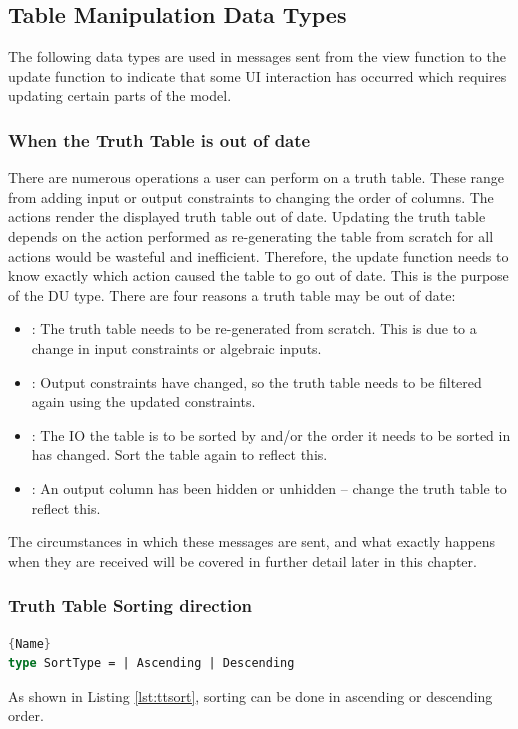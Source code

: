 \subsection{Table Manipulation Data Types}
The following data types are used in messages sent from the view function to the update function to indicate that some UI interaction has occurred which requires updating certain parts of the model.

\subsubsection{When the Truth Table is out of date}
There are numerous operations a user can perform on a truth table. These range from adding input or output constraints to changing the order of columns. The actions render the displayed truth table out of date. Updating the truth table depends on the action performed as re-generating the table from scratch for all actions would be wasteful and inefficient. Therefore, the update function needs to know exactly which action caused the table to go out of date. This is the purpose of the  DU type. There are four reasons a truth table may be out of date:
\begin{itemize}
    \item {}: The truth table needs to be re-generated from scratch. This is due to a change in input constraints or algebraic inputs.
    \item {}: Output constraints have changed, so the truth table needs to be filtered again using the updated constraints.
    \item {}: The IO the table is to be sorted by and/or the order it needs to be sorted in has changed. Sort the table again to reflect this.
    \item {}: An output column has been hidden or unhidden -- change the truth table to reflect this.
\end{itemize}
The circumstances in which these messages are sent, and what exactly happens when they are received will be covered in further detail later in this chapter.

\subsubsection{Truth Table Sorting direction}
\begin{lstlisting}[caption=Definition for Sort Type,frame=tlrb, language=FSharp, label=lst:ttsort]{Name}
type SortType = | Ascending | Descending
\end{lstlisting} 
As shown in Listing \ref{lst:ttsort}, sorting can be done in ascending or descending order.

